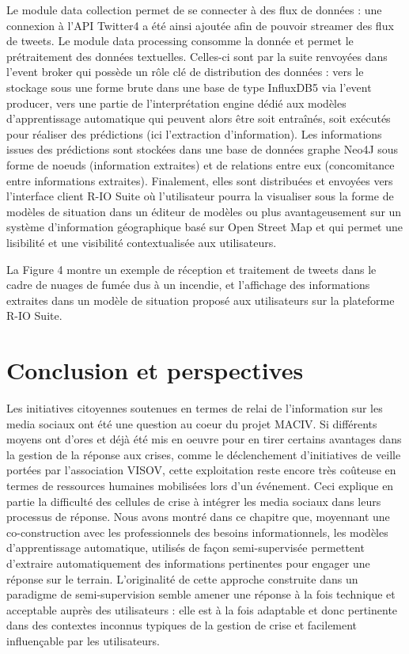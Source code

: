 Le module data collection permet de se connecter à des flux de données : une
connexion à l'API Twitter4 a été ainsi ajoutée afin de pouvoir streamer des flux de
tweets.
Le module data processing consomme la donnée et permet le prétraitement
des données textuelles.
Celles-ci sont par la suite renvoyées dans l'event broker qui possède un rôle clé de distribution des données : vers le stockage sous une forme brute dans une base de type InfluxDB5 via l'event producer, vers une partie de
l'interprétation engine dédié aux modèles d'apprentissage automatique qui peuvent
alors être soit entraînés, soit exécutés pour réaliser des prédictions (ici l'extraction
d'information).
Les informations issues des prédictions sont stockées dans une base de données graphe Neo4J sous forme de noeuds (information extraites) et de relations entre eux (concomitance entre informations extraites).
Finalement, elles sont distribuées et envoyées vers l'interface client R-IO Suite où l'utilisateur pourra la visualiser sous la forme de modèles de situation dans un éditeur de modèles ou plus avantageusement sur un système d'information géographique basé sur Open Street
Map et qui permet une lisibilité et une visibilité contextualisée aux utilisateurs.

La Figure 4 montre un exemple de réception et traitement de tweets dans le cadre de
nuages de fumée dus à un incendie, et l'affichage des informations extraites dans un
modèle de situation proposé aux utilisateurs sur la plateforme R-IO Suite.


\section*{Conclusion et perspectives}

Les initiatives citoyennes soutenues en termes de relai de l'information sur les media sociaux ont été une question au coeur du projet MACIV.
Si différents moyens ont d'ores et déjà été mis en oeuvre pour en tirer certains avantages dans la gestion de la réponse aux crises, comme le déclenchement d'initiatives de veille portées par l'association VISOV, cette exploitation reste encore très coûteuse en
termes de ressources humaines mobilisées lors d'un événement.
Ceci explique en partie la difficulté des cellules de crise à intégrer les media sociaux dans leurs processus de réponse.
Nous avons montré dans ce chapitre que, moyennant une co-construction avec les professionnels des besoins informationnels, les modèles d'apprentissage automatique, utilisés de façon semi-supervisée permettent d'extraire automatiquement des
informations pertinentes pour engager une réponse sur le terrain.
L'originalité de cette approche construite dans un paradigme de semi-supervision semble amener une réponse à la fois technique et acceptable auprès des utilisateurs : elle est à la fois adaptable et donc pertinente dans des contextes inconnus typiques de la gestion de
crise et facilement influençable par les utilisateurs.

